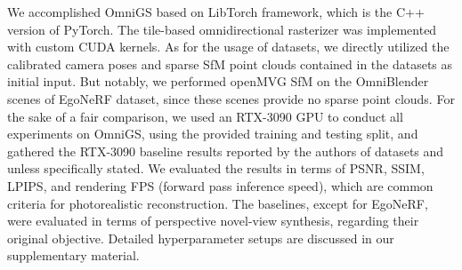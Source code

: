\documentclass[10pt,twocolumn,letterpaper]{article}
\begin{document}
We accomplished OmniGS based on LibTorch framework, which is the C++ version of PyTorch. The tile-based omnidirectional rasterizer was implemented with custom CUDA kernels. As for the usage of datasets, we directly utilized the calibrated camera poses and sparse SfM point clouds contained in the datasets as initial input. But notably, we performed openMVG \cite{sparse:openmvg} SfM on the OmniBlender scenes of EgoNeRF dataset, since these scenes provide no sparse point clouds. For the sake of a fair comparison, we used an RTX-3090 GPU to conduct all experiments on OmniGS, using the provided training and testing split, and gathered the RTX-3090 baseline results reported by the authors of datasets \cite{nerf:360roam} and \cite{nerf:egonerf} unless specifically stated. We evaluated the results in terms of PSNR, SSIM, LPIPS, and rendering FPS {(forward pass inference speed)}, which are common criteria for photorealistic reconstruction. The baselines, except for EgoNeRF, were evaluated in terms of perspective novel-view synthesis, regarding their original objective. Detailed hyperparameter setups are discussed in our supplementary material.
\end{document}
